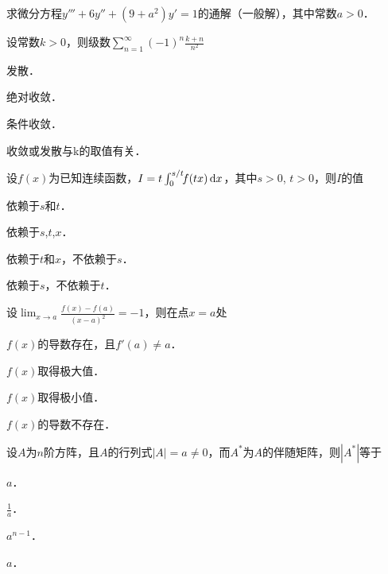 \documentclass[plain,noanswer,medmath]{../../template/jnuexam}
\begin{document}

\begin{problem}
求微分方程$y''' + 6y'' + (9 + a^2)y' = 1$的通解（一般解），其中常数$a > 0$．
\end{problem}




\begin{problem}
设常数$k > 0$，则级数$\sum_{n = 1}^{\infty}(- 1)^n\frac{k + n}{n^2}$\pickout{}
\begin{abcd}
\item 发散．						
\item 绝对收敛．
\item 条件收敛．				
\item 收敛或发散与k的取值有关．
\end{abcd}
\end{problem}


\begin{problem}
设$f(x)$为已知连续函数，$I=t\int_0^{s/t}\!\!f(tx)\mathop{}\!\mathrm{d} x$，其中$s>0$, $t>0$，则$I$的值\pickout{}
\begin{abcd}
\item 依赖于$s$和$t$．
\item 依赖于$s$,$t$,$x$．
\item 依赖于$t$和$x$，不依赖于$s$．
\item 依赖于$s$，不依赖于$t$．
\end{abcd}
\end{problem}


\begin{problem}
设$\lim_{x \to a} \frac{f(x)-f(a)}{(x-a)^2}=-1$，则在点$x=a$处\pickout{}
\begin{abcd}
\item $f(x)$的导数存在，且$f'(a) \ne a$．			
\item $f(x)$取得极大值．
\item $f(x)$取得极小值．					
\item $f(x)$的导数不存在．
\end{abcd}
\end{problem}


\begin{problem}
设$A$为$n$阶方阵，且$A$的行列式$|A|=a \ne 0$，而$A^*$为$A$的伴随矩阵，则$|A^*|$等于\pickout{}
\begin{abcd}
\item $a$．       
\item $\frac{1}{a}$．     
\item $a^{n - 1}$．
\item $a$．
\end{abcd}
\end{problem}
\end{document}
